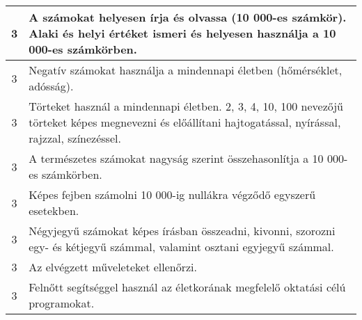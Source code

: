 \begin{longtable}{c | p{12cm} }
                                
                                          3 &  A számokat helyesen írja és olvassa (10 000-es számkör). Alaki és helyi értéket ismeri és helyesen használja a 10 000-es számkörben. \\ \hline
                                          3 &  Negatív számokat használja a mindennapi életben (hőmérséklet, adósság). \\ \hline
                                          3 &  Törteket használ a mindennapi életben. 2, 3, 4, 10, 100 nevezőjű törteket képes megnevezni és előállítani hajtogatással, nyírással, rajzzal, színezéssel. \\ \hline
                                          3 &  A természetes számokat nagyság szerint összehasonlítja a 10 000-es számkörben. \\ \hline
                                          3 &  Képes fejben számolni 10 000-ig nullákra végződő egyszerű esetekben. \\ \hline
                                          3 &  Négyjegyű számokat képes írásban összeadni, kivonni, szorozni egy- és kétjegyű számmal, valamint osztani egyjegyű számmal. \\ \hline
                                          3 &  Az elvégzett műveleteket ellenőrzi. \\ \hline
                                          3 &  Felnőtt segítséggel használ az életkorának megfelelő oktatási célú programokat. \\ \hline
                                      

\end{longtable}
